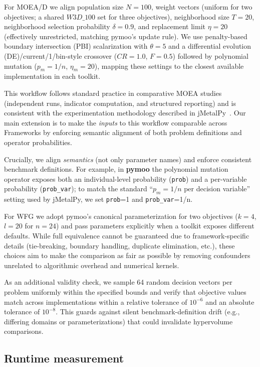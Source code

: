 \documentclass[journal]{IEEEtran}
\begin{document}
For MOEA/D we align population size $N=100$, weight vectors (uniform for two objectives; a shared $W3D\_100$ set for three objectives), neighborhood size $T=20$, neighborhood selection probability $\delta=0.9$, and replacement limit $\eta=20$ (effectively unrestricted, matching pymoo's update rule). We use penalty-based boundary intersection (PBI) scalarization with $\theta=5$ and a differential evolution (DE)/current/1/bin-style crossover ($CR=1.0$, $F=0.5$) followed by polynomial mutation ($p_m=1/n$, $\eta_m=20$), mapping these settings to the closest available implementation in each toolkit.

This workflow follows standard practice in comparative MOEA studies (independent runs, indicator computation, and structured reporting) and is consistent with the experimentation methodology described in jMetalPy~\cite{BNG+19}. Our main extension is to make the \emph{inputs} to this workflow comparable across Frameworks by enforcing semantic alignment of both problem definitions and operator probabilities.

Crucially, we align \emph{semantics} (not only parameter names) and enforce consistent benchmark definitions. For example, in \textbf{pymoo} the polynomial mutation operator exposes both an individual-level probability (\texttt{prob}) and a per-variable probability (\texttt{prob\_var}); to match the standard ``$p_m=1/n$ per decision variable'' setting used by jMetalPy, we set \texttt{prob}=1 and \texttt{prob\_var}=1/n.

For WFG we adopt pymoo's canonical parameterization for two objectives ($k=4$, $l=20$ for $n=24$) and pass parameters explicitly when a toolkit exposes different defaults. While full equivalence cannot be guaranteed due to framework-specific details (tie-breaking, boundary handling, duplicate elimination, etc.), these choices aim to make the comparison as fair as possible by removing confounders unrelated to algorithmic overhead and numerical kernels.

As an additional validity check, we sample 64 random decision vectors per problem uniformly within the specified bounds and verify that objective values match across implementations within a relative tolerance of $10^{-6}$ and an absolute tolerance of $10^{-8}$. This guards against silent benchmark-definition drift (e.g., differing domains or parameterizations) that could invalidate hypervolume comparisons.

\subsection{Runtime measurement}
\end{document}
